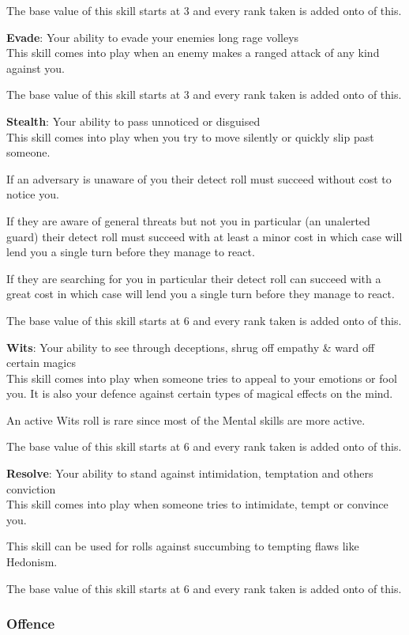 The base value of this skill starts at 3 and every rank taken is added onto of this.


\textbf{Evade}: Your ability to evade your enemies long rage volleys\\
This skill comes into play when an enemy makes a ranged attack of any kind against you. 

The base value of this skill starts at 3 and every rank taken is added onto of this.


\textbf{Stealth}: Your ability to pass unnoticed or disguised\\
This skill comes into play when you try to move silently or quickly slip past someone. 

If an adversary is unaware of you their detect roll must succeed without cost to notice you.

If they are aware of general threats but not you in particular (an unalerted guard) their detect roll must succeed 
with at least a minor cost in which case will lend you a single turn before they manage to react.

If they are searching for you in particular their detect roll can succeed 
with a great cost in which case will lend you a single turn before they manage to react.

The base value of this skill starts at 6 and every rank taken is added onto of this.

\textbf{Wits}: Your ability to see through deceptions, shrug off empathy \& ward off certain magics\\
This skill comes into play when someone tries to appeal to your emotions or fool you. It is also your defence against certain
types of magical effects on the mind.

An active Wits roll is rare since most of the Mental skills are more active.

The base value of this skill starts at 6 and every rank taken is added onto of this.

\textbf{Resolve}: Your ability to stand against intimidation, temptation and others conviction\\
This skill comes into play when someone tries to intimidate, tempt or convince you. 

This skill can be used for rolls against succumbing to tempting flaws like Hedonism.

The base value of this skill starts at 6 and every rank taken is added onto of this.

\subsubsection{Offence}

